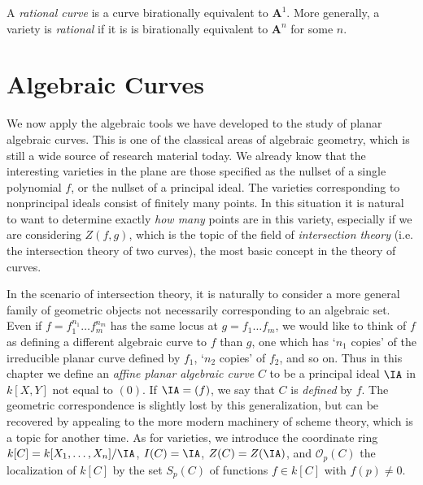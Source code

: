 A \emph{rational curve} is a curve birationally equivalent to $\mathbf{A}^1$. More generally, a variety is \emph{rational} if it is is birationally equivalent to $\mathbf{A}^n$ for some $n$.














\chapter{Algebraic Curves}

We now apply the algebraic tools we have developed to the study of planar algebraic curves. This is one of the classical areas of algebraic geometry, which is still a wide source of research material today. We already know that the interesting varieties in the plane are those specified as the nullset of a single polynomial $f$, or the nullset of a principal ideal. The varieties corresponding to nonprincipal ideals consist of finitely many points. In this situation it is natural to want to determine exactly {\it how many} points are in this variety, especially if we are considering $Z(f,g)$, which is the topic of the field of {\it intersection theory} (i.e. the intersection theory of two curves), the most basic concept in the theory of curves.

In the scenario of intersection theory, it is naturally to consider a more general family of geometric objects not necessarily corresponding to an algebraic set. Even if $f = f_1^{n_1} \dots f_m^{n_m}$ has the same locus at $g = f_1 \dots f_m$, we would like to think of $f$ as defining a different algebraic curve to $f$ than $g$, one which has `$n_1$ copies' of the irreducible planar curve defined by $f_1$, `$n_2$ copies' of $f_2$, and so on. Thus in this chapter we define an \emph{affine planar algebraic curve} $C$ to be a principal ideal $\IA$ in $k[X,Y]$ not equal to $(0)$. If $\IA = (f)$, we say that $C$ is \emph{defined} by $f$. The geometric correspondence is slightly lost by this generalization, but can be recovered by appealing to the more modern machinery of scheme theory, which is a topic for another time. As for varieties, we introduce the coordinate ring $k[C] = k[X_1,\dots,X_n]/\IA$, $I(C) = \IA$, $Z(C) = Z(\IA)$, and $\mathcal{O}_p(C)$ the localization of $k[C]$ by the set $S_p(C)$ of functions $f \in k[C]$ with $f(p) \neq 0$.

